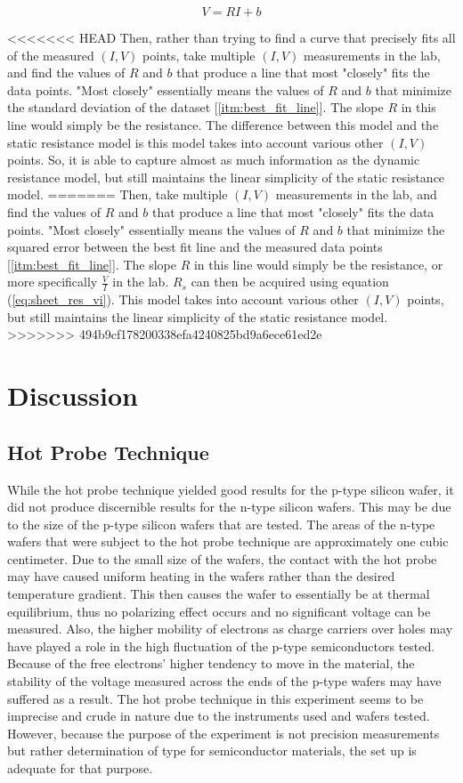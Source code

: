 \documentclass{article}
\begin{document}
\begin{equation}
\label{eq:linear_reg}
V = RI + b
\end{equation}

<<<<<<< HEAD
Then, rather than trying to find a curve that precisely fits all of the measured $(I,V)$ points, take multiple $(I,V)$ measurements in the lab, and find the values of $R$ and $b$ that produce a line that most "closely" fits the data points. "Most closely" essentially means the values of $R$ and $b$ that minimize the standard deviation of the dataset [\ref{itm:best_fit_line}].
The slope $R$ in this line would simply be the resistance. The difference between this model and the static resistance model is this model takes into account various other $(I,V)$ points. So, it is able to capture almost as much information as the dynamic resistance model, but still maintains the linear simplicity of the static resistance model.
=======
Then, take multiple $(I,V)$ measurements in the lab, and find the values of $R$ and $b$ that produce a line that most "closely" fits the data points. "Most closely" essentially means the values of $R$ and $b$ that minimize the squared error between the best fit line and the measured data points [\ref{itm:best_fit_line}].
The slope $R$ in this line would simply be the resistance, or more specifically $\frac{V}{I}$ in the lab. $R_{s}$ can then be acquired using equation (\ref{eq:sheet_res_vi}). This model takes into account various other $(I,V)$ points, but still maintains the linear simplicity of the static resistance model.
>>>>>>> 494b9cf178200338efa4240825bd9a6ece61ed2e

	
	\section{Discussion}
	\subsection{Hot Probe Technique}
	While the hot probe technique yielded good results for the p-type silicon wafer, it did not produce discernible results for the n-type silicon wafers. This may be due to the size of the p-type silicon wafers that are tested. The areas of the n-type wafers that were subject to the hot probe technique are approximately one cubic centimeter. Due to the small size of the wafers, the contact with the hot probe may have caused uniform heating in the wafers rather than the desired temperature gradient. This then causes the wafer to essentially be at thermal equilibrium, thus no polarizing effect occurs and no significant voltage can be measured. Also, the higher mobility of electrons as charge carriers over holes may have played a role in the high fluctuation of the p-type semiconductors tested. Because of the free electrons' higher tendency to move in the material, the stability of the voltage measured across the ends of the p-type wafers may have suffered as a result. The hot probe technique in this experiment seems to be imprecise and crude in nature due to the instruments used and wafers tested. However, because the purpose of the experiment is not precision measurements but rather determination of type for semiconductor materials, the set up is adequate for that purpose.
\end{document}
